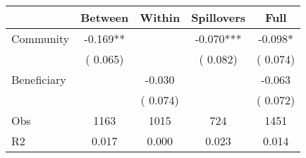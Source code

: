 
\begin{tabular}{l*{4}{c}}\hline&\multicolumn{1}{c}{Between}&\multicolumn{1}{c}{Within}&\multicolumn{1}{c}{Spillovers}&\multicolumn{1}{c}{Full}\\ \hline
 Community             &             -0.169**      &                                               &       -0.070*** &        -0.098*                            \\ 
                               &        (       0.065)           &                                       &       (       0.082)     &      (       0.074)                                           \\ 
 Beneficiary   &                                               &       -0.030    &                                &            -0.063                            \\ 
                               &                                               & (       0.074)                  &                                        &      (       0.072)                                           \\ 
\hline                                                                                                                                                                                                                                            
 Obs                   &               1163               &       1015                       &       724                &              1451                                               \\ 
 R2                    &                      0.017              &              0.000                      &              0.023               &                     0.014                                              \\ 
\hline \end{tabular}                                                                                                                                                                                                              